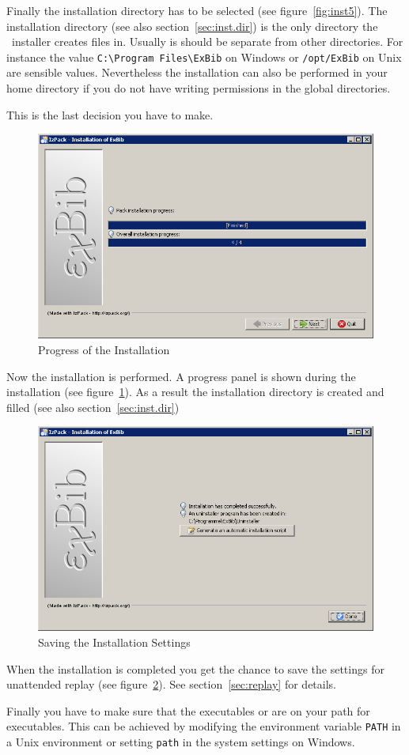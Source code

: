 Finally the installation directory has to be selected (see
figure~\ref{fig:inst5}). The installation directory (see also
section~\ref{sec:inst.dir}) is the only directory the \ExBib\ 
installer creates files in. Usually is should be separate from other
directories. For instance the value \verb|C:\Program Files\ExBib| on
Windows\index{Windows} or \verb|/opt/ExBib| on Unix\index{Unix} are
sensible values. Nevertheless the installation can also be performed
in your home directory if you do not have writing permissions in the
global directories.

This is the last decision you have to make.

\begin{figure}[!ht]
  \centering
  \includegraphics[width=.45\textwidth]{img/inst7}
  \caption{Progress of the Installation}
  \label{fig:inst6}
\end{figure}

Now the installation is performed. A progress panel is shown during
the installation (see figure~\ref{fig:inst6}). As a result the
installation directory is created and filled (see also
section~\ref{sec:inst.dir})

\begin{figure}[!ht]
  \centering
  \includegraphics[width=.45\textwidth]{img/inst8}
  \caption{Saving the Installation Settings}
  \label{fig:inst7}
\end{figure}

When the installation is completed you get the chance to save the
settings for unattended replay (see figure~\ref{fig:inst7}). See
section~\ref{sec:replay} for details.


Finally you have to make sure that the executables  or
\Prog{exbib.bat} are on your path for executables.\index{path} This
can be achieved by modifying the environment variable \verb|PATH| in a
Unix environment or setting \verb|path| in the system settings on
Windows.


